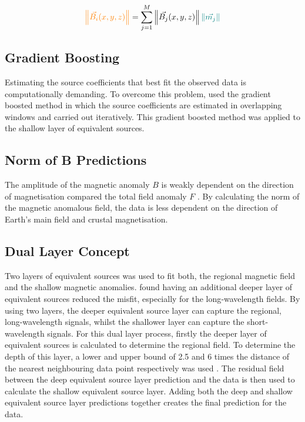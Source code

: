 \begin{equation}
  \textcolor{orange}{\left\lVert \vec{B_i}(x,y,z) \right\rVert} = \sum_{j=1}^{M} \left\lVert \vec{B_j}(x,y,z) \right\rVert \textcolor{teal}{\left\lVert \vec{m_j} \right\rVert}
\end{equation}



\subsection{Gradient Boosting}
Estimating the source coefficients that best fit the observed data is computationally demanding. To overcome this problem, \cite{SolerUieda2021} used the gradient boosted method in which the source coefficients are estimated in overlapping windows and carried out iteratively. This gradient boosted method was applied to the shallow layer of equivalent sources.

\subsection{Norm of B Predictions}
The amplitude of the magnetic anomaly $B$ is weakly dependent on the direction of magnetisation compared the total field anomaly $F$ \cite{HidalgoGato2021}. By calculating the norm of the magnetic anomalous field, the data is less dependent on the direction of Earth’s main field and crustal magnetisation.

\subsection{Dual Layer Concept}
Two layers of equivalent sources was used to fit both, the regional magnetic field and the shallow magnetic anomalies. \cite{Li2019} found having an additional deeper layer of equivalent sources reduced the misfit, especially for the long‐wavelength fields. By using two layers, the deeper equivalent source layer can capture the regional, long-wavelength signals, whilst the shallower layer can capture the short-wavelength signals. For this dual layer process, firstly the deeper layer of equivalent sources is calculated to determine the regional field. To determine the depth of this layer, a lower and upper bound of 2.5 and 6 times the distance of the nearest neighbouring data point respectively was used \cite{Dampney1969}. The residual field between the deep equivalent source layer prediction and the data is then used to calculate the shallow equivalent source layer. Adding both the deep and shallow equivalent source layer predictions together creates the final prediction for the data.


